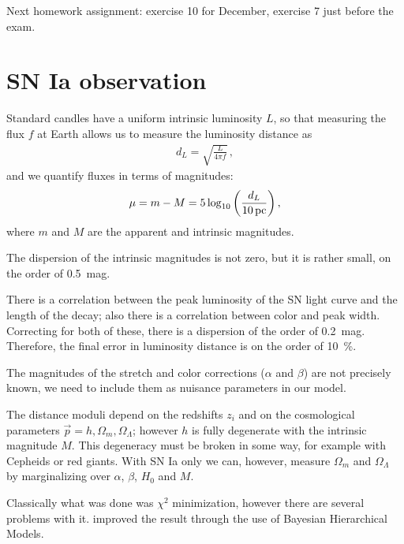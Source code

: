 \documentclass[main.tex]{subfiles}
\begin{document}

Next homework assignment: exercise 10 for December, exercise 7 just before the exam. 

 \section{SN Ia observation}
 
Standard candles have a uniform intrinsic luminosity \(L\), so that measuring the flux \(f\) at Earth allows us to measure the luminosity distance as 
%
\begin{align}
d_L = \sqrt{\frac{L}{4 \pi f}}
\,,
\end{align}
%
and we quantify fluxes in terms of magnitudes: 
%
\begin{align}
\mu = m - M = 5 \log_{10} \qty( \frac{d_L}{\SI{10}{pc}})
\,,
\end{align}
%
where \(m\) and \(M\) are the apparent and intrinsic magnitudes.

The dispersion of the intrinsic magnitudes is not zero, but it is rather small, on the order of \SI{.5}{mag}.

There is a correlation between the peak luminosity of the SN light curve and the length of the decay; also there is a correlation between color and peak width.
Correcting for both of these, there is a dispersion of the order of \SI{.2}{mag}. 
Therefore, the final error in luminosity distance is on the order of \SI{10}{\percent}. 

The magnitudes of the stretch and color corrections (\(\alpha \) and \(\beta \)) are not precisely known, we need to include them as nuisance parameters in our model. 


The distance moduli depend on the redshifts \(z_i\) and on the cosmological parameters \(\vec{p} = h, \Omega _m, \Omega _\Lambda \); however \(h\) is fully degenerate with the intrinsic magnitude \(M\). 
This degeneracy must be broken in some way, for example with Cepheids or red giants. 
With SN Ia only we can, however, measure \(\Omega _m\) and \(\Omega _\Lambda \) by marginalizing over \(\alpha \), \(\beta \), \(H_0 \) and \(M\). 

Classically what was done was \(\chi^2\) minimization, however there are several problems with it. 
\textcite[]{marchImprovedConstraintsCosmological2011} improved the result through the use of Bayesian Hierarchical Models. 
\end{document}
